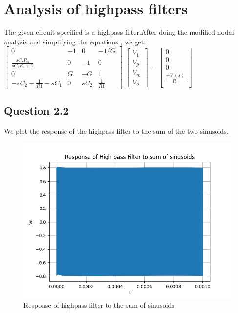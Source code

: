 \documentclass[11pt, a4paper]{article}
\begin{document}
\section*{Analysis of highpass filters}
The given circuit specified is a highpass filter.After doing the modified nodal analysis and simplifying the equations , we get:
\newline
$\begin{bmatrix}
    0   & -1 & 0  & -1/G \\
    \frac{sC_2R_3}{sC_2R_3+1}  & 0 & -1 & 0\\
    0  & G & -G & 1 \\
    -sC_2-\frac{1}{R1} - sC_1 & 0 & sC_2 & \frac{1}{R1}
\end{bmatrix}$
$\begin{bmatrix}
    V_1\\
    V_p\\
    V_m \\
    V_o
\end{bmatrix}$
=
$\begin{bmatrix}
    0 \\
    0 \\
    0 \\
    \frac{-V_i(s)}{R_1} \\
    
\end{bmatrix}$

\subsection*{Question 2.2}
We plot the response of the highpass filter to the sum of the two sinusoids.
\begin{figure}[!tbh]
\centering
\includegraphics[scale=0.5]{assgn8_plot5.png} 
\caption{Response of highpass filter to the sum of sinusoids}
\label{fig4}
\end{figure}
\end{document}
